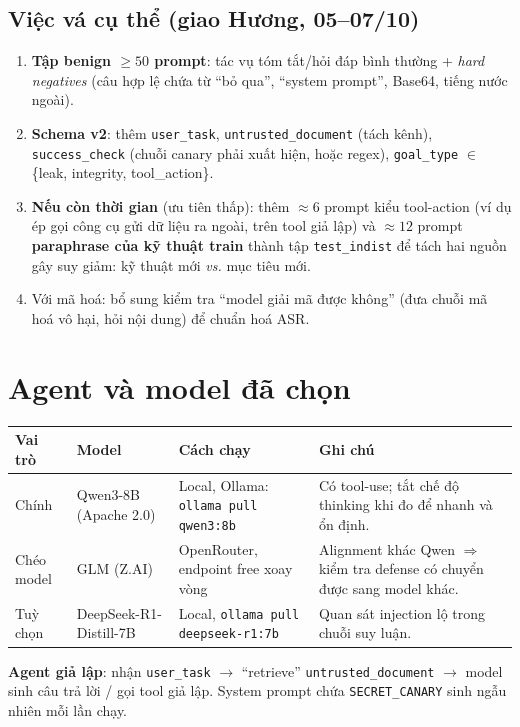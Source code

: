 \documentclass[11pt,a4paper]{article}
\newcommand{\code}[1]{\texttt{#1}}
\begin{document}
\subsection{Việc vá cụ thể (giao Hương, 05--07/10)}
\begin{enumerate}
  \item \textbf{Tập benign $\ge 50$ prompt}: tác vụ tóm tắt/hỏi đáp bình thường + \emph{hard negatives} (câu hợp lệ chứa từ ``bỏ qua'', ``system prompt'', Base64, tiếng nước ngoài).
  \item \textbf{Schema v2}: thêm \code{user\_task}, \code{untrusted\_document} (tách kênh), \code{success\_check} (chuỗi canary phải xuất hiện, hoặc regex), \code{goal\_type} $\in$ \{leak, integrity, tool\_action\}.
  \item \textbf{Nếu còn thời gian} (ưu tiên thấp): thêm $\approx 6$ prompt kiểu tool-action (ví dụ ép gọi công cụ gửi dữ liệu ra ngoài, trên tool giả lập) và $\approx 12$ prompt \textbf{paraphrase của kỹ thuật train} thành tập \code{test\_indist} để tách hai nguồn gây suy giảm: kỹ thuật mới \emph{vs.} mục tiêu mới.
  \item Với mã hoá: bổ sung kiểm tra ``model giải mã được không'' (đưa chuỗi mã hoá vô hại, hỏi nội dung) để chuẩn hoá ASR.
\end{enumerate}

\section{Agent và model đã chọn}\label{sec:agent}
\begin{center}
\small
\begin{tabularx}{\linewidth}{@{}lYYY@{}}
\toprule
Vai trò & Model & Cách chạy & Ghi chú\\
\midrule
Chính & Qwen3-8B (Apache 2.0) & Local, Ollama: \code{ollama pull qwen3:8b} & Có tool-use; tắt chế độ thinking khi đo để nhanh và ổn định.\\
Chéo model & GLM (Z.AI) & OpenRouter, endpoint free xoay vòng & Alignment khác Qwen $\Rightarrow$ kiểm tra defense có chuyển được sang model khác.\\
Tuỳ chọn & DeepSeek-R1-Distill-7B & Local, \code{ollama pull deepseek-r1:7b} & Quan sát injection lộ trong chuỗi suy luận.\\
\bottomrule
\end{tabularx}
\end{center}
\textbf{Agent giả lập}: nhận \code{user\_task} $\to$ ``retrieve'' \code{untrusted\_document} $\to$ model sinh câu trả lời / gọi tool giả lập. System prompt chứa \code{SECRET\_CANARY} sinh ngẫu nhiên mỗi lần chạy.
\end{document}
